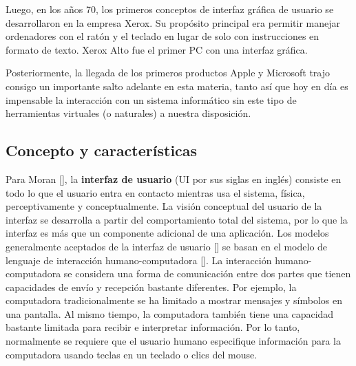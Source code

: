 
Luego, en los años 70, los primeros conceptos de interfaz gráfica de usuario se desarrollaron en la empresa Xerox. Su propósito principal era permitir manejar ordenadores con el ratón y el teclado en lugar de solo con instrucciones en formato de texto. Xerox Alto fue el primer PC con una interfaz gráfica.

Posteriormente, la llegada de los primeros productos Apple y Microsoft trajo consigo un importante salto adelante en esta materia, tanto así que hoy en día es impensable la interacción con un sistema informático sin este tipo de herramientas virtuales (o naturales) a nuestra disposición.

\subsection{Concepto y características}

Para Moran [\cite{23}], la \textbf{interfaz de usuario} (UI por sus siglas en inglés) consiste en todo lo que el usuario entra en contacto mientras usa el sistema, física, perceptivamente y conceptualmente. La visión conceptual del usuario de la interfaz se desarrolla a partir del comportamiento total del sistema, por lo que la interfaz es más que un componente adicional de una aplicación. Los modelos generalmente aceptados de la interfaz de usuario [\cite{24, 25, 26}] se basan en el modelo de lenguaje de interacción humano-computadora [\cite{28}]. La interacción humano-computadora se considera una forma de comunicación entre dos partes que tienen capacidades de envío y recepción bastante diferentes. Por ejemplo, la computadora tradicionalmente se ha limitado a mostrar mensajes y símbolos en una pantalla. Al mismo tiempo, la computadora también tiene una capacidad bastante limitada para recibir e interpretar información. Por lo tanto, normalmente se requiere que el usuario humano especifique información para la computadora usando teclas en un teclado o clics del mouse.


